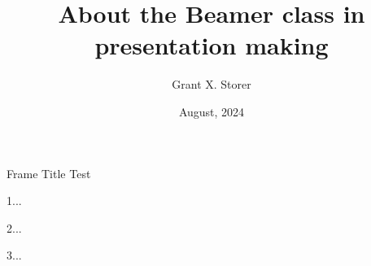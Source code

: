 \documentclass{beamer}
\title[About Beamer] %
    {About the Beamer class in presentation making}
\author{Grant X. Storer}
\institute{IDB}
\date{August, 2024}
\begin{document}
    \frame{\titlepage}

\begin{frame}{Frame Title}
    Test
    
    1...
    
    2...
    
    3...
\end{frame}
\end{document}
